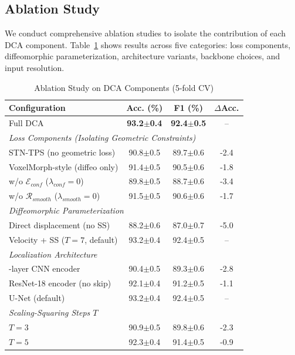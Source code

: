 \documentclass[final,3p,times,review,sort&compress]{elsarticle}
\begin{document}
\subsection{Ablation Study}

We conduct comprehensive ablation studies to isolate the contribution of each DCA component. Table~\ref{tab:ablation} shows results across five categories: loss components, diffeomorphic parameterization, architecture variants, backbone choices, and input resolution.

\begin{table}[t]
\centering
\caption{Ablation Study on DCA Components (5-fold CV)}
\label{tab:ablation}
\begin{tabularx}{\textwidth}{Xccc}
\hline
\textbf{Configuration} & \textbf{Acc. (\%)} & \textbf{F1 (\%)} & \textbf{$\Delta$Acc.} \\
\hline
Full DCA & \textbf{93.2$\pm$0.4} & \textbf{92.4$\pm$0.5} & -- \\
\hline
\multicolumn{4}{l}{\textit{Loss Components (Isolating Geometric Constraints)}} \\
\quad STN-TPS (no geometric loss) & 90.8$\pm$0.5 & 89.7$\pm$0.6 & -2.4 \\
\quad VoxelMorph-style (diffeo only) & 91.4$\pm$0.5 & 90.5$\pm$0.6 & -1.8 \\
\quad w/o $\mathcal{E}_{conf}$ ($\lambda_{conf}=0$) & 89.8$\pm$0.5 & 88.7$\pm$0.6 & -3.4 \\
\quad w/o $\mathcal{R}_{smooth}$ ($\lambda_{smooth}=0$) & 91.5$\pm$0.5 & 90.6$\pm$0.6 & -1.7 \\
\hline
\multicolumn{4}{l}{\textit{Diffeomorphic Parameterization}} \\
\quad Direct displacement (no SS) & 88.2$\pm$0.6 & 87.0$\pm$0.7 & -5.0 \\
\quad Velocity + SS ($T=7$, default) & 93.2$\pm$0.4 & 92.4$\pm$0.5 & -- \\
\hline
\multicolumn{4}{l}{\textit{Localization Architecture}} \\
\quad 3-layer CNN encoder & 90.4$\pm$0.5 & 89.3$\pm$0.6 & -2.8 \\
\quad ResNet-18 encoder (no skip) & 92.1$\pm$0.4 & 91.2$\pm$0.5 & -1.1 \\
\quad U-Net (default) & 93.2$\pm$0.4 & 92.4$\pm$0.5 & -- \\
\hline
\multicolumn{4}{l}{\textit{Scaling-Squaring Steps $T$}} \\
\quad $T=3$ & 90.9$\pm$0.5 & 89.8$\pm$0.6 & -2.3 \\
\quad $T=5$ & 92.3$\pm$0.4 & 91.4$\pm$0.5 & -0.9 \\

\end{tabularx}
\end{table}
\end{document}
